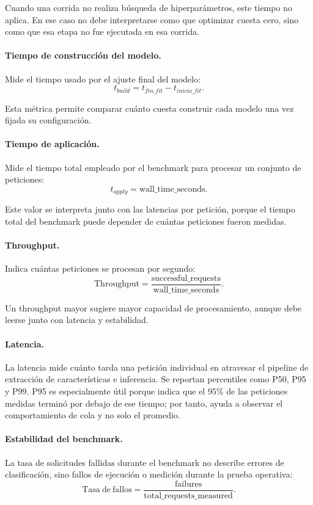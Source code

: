 \documentclass[12pt,oneside]{report}
\begin{document}
Cuando una corrida no realiza búsqueda de hiperparámetros, este tiempo no aplica. En ese caso no debe interpretarse como que optimizar cuesta cero, sino como que esa etapa no fue ejecutada en esa corrida.

\paragraph{Tiempo de construcción del modelo.}
Mide el tiempo usado por el ajuste final del modelo:
\[
t_{build}=t_{fin\_fit}-t_{inicio\_fit}.
\]

Esta métrica permite comparar cuánto cuesta construir cada modelo una vez fijada su configuración.

\paragraph{Tiempo de aplicación.}
Mide el tiempo total empleado por el benchmark para procesar un conjunto de peticiones:
\[
t_{apply}=\mathrm{wall\_time\_seconds}.
\]

Este valor se interpreta junto con las latencias por petición, porque el tiempo total del benchmark puede depender de cuántas peticiones fueron medidas.

\paragraph{Throughput.}
Indica cuántas peticiones se procesan por segundo:
\[
\mathrm{Throughput}=\frac{\mathrm{successful\_requests}}{\mathrm{wall\_time\_seconds}}.
\]

Un throughput mayor sugiere mayor capacidad de procesamiento, aunque debe leerse junto con latencia y estabilidad.

\paragraph{Latencia.}
La latencia mide cuánto tarda una petición individual en atravesar el pipeline de extracción de características e inferencia. Se reportan percentiles como P50, P95 y P99. P95 es especialmente útil porque indica que el 95\% de las peticiones medidas terminó por debajo de ese tiempo; por tanto, ayuda a observar el comportamiento de cola y no solo el promedio.

\paragraph{Estabilidad del benchmark.}
La tasa de solicitudes fallidas durante el benchmark no describe errores de clasificación, sino fallos de ejecución o medición durante la prueba operativa:
\[
\mathrm{Tasa\ de\ fallos}=\frac{\mathrm{failures}}{\mathrm{total\_requests\_measured}}.
\]
\end{document}

